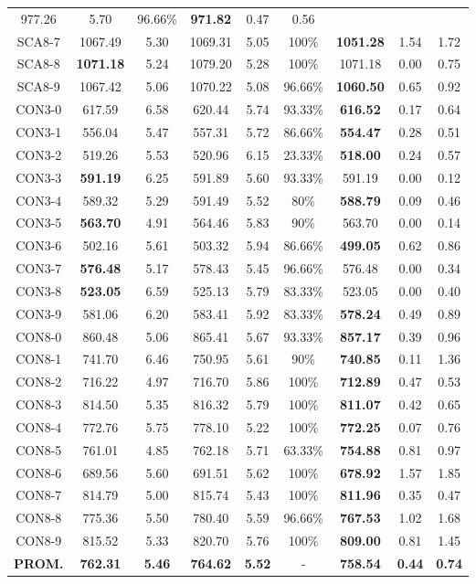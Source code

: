 \begin{table}[ht]
\begin{tabular}{c c c c c c c c c}
977.26 & 5.70 & 96.66\% & \bf{971.82} & 
0.47 & 0.56\\SCA8-7 & 1067.49 & 5.30 & 
1069.31 & 5.05 & 100\% & \bf{1051.28} & 
1.54 & 1.72\\SCA8-8 & \bf{1071.18} & 5.24 & 
1079.20 & 5.28 & 100\% & 1071.18 & 0.00
 & 0.75\\SCA8-9 & 1067.42 & 5.06 & 
1070.22 & 5.08 & 96.66\% & \bf{1060.50} & 
0.65 & 0.92\\CON3-0 & 617.59 & 6.58 & 
620.44 & 5.74 & 93.33\% & \bf{616.52} & 
0.17 & 0.64\\CON3-1 & 556.04 & 5.47 & 
557.31 & 5.72 & 86.66\% & \bf{554.47} & 
0.28 & 0.51\\CON3-2 & 519.26 & 5.53 & 
520.96 & 6.15 & 23.33\% & \bf{518.00} & 
0.24 & 0.57\\CON3-3 & \bf{591.19} & 6.25 & 
591.89 & 5.60 & 93.33\% & 591.19 & 0.00
 & 0.12\\CON3-4 & 589.32 & 5.29 & 
591.49 & 5.52 & 80\% & \bf{588.79} & 
0.09 & 0.46\\CON3-5 & \bf{563.70} & 4.91 & 
564.46 & 5.83 & 90\% & 563.70 & 0.00
 & 0.14\\CON3-6 & 502.16 & 5.61 & 
503.32 & 5.94 & 86.66\% & \bf{499.05} & 
0.62 & 0.86\\CON3-7 & \bf{576.48} & 5.17 & 
578.43 & 5.45 & 96.66\% & 576.48 & 0.00
 & 0.34\\CON3-8 & \bf{523.05} & 6.59 & 
525.13 & 5.79 & 83.33\% & 523.05 & 0.00
 & 0.40\\CON3-9 & 581.06 & 6.20 & 
583.41 & 5.92 & 83.33\% & \bf{578.24} & 
0.49 & 0.89\\CON8-0 & 860.48 & 5.06 & 
865.41 & 5.67 & 93.33\% & \bf{857.17} & 
0.39 & 0.96\\CON8-1 & 741.70 & 6.46 & 
750.95 & 5.61 & 90\% & \bf{740.85} & 
0.11 & 1.36\\CON8-2 & 716.22 & 4.97 & 
716.70 & 5.86 & 100\% & \bf{712.89} & 
0.47 & 0.53\\CON8-3 & 814.50 & 5.35 & 
816.32 & 5.79 & 100\% & \bf{811.07} & 
0.42 & 0.65\\CON8-4 & 772.76 & 5.75 & 
778.10 & 5.22 & 100\% & \bf{772.25} & 
0.07 & 0.76\\CON8-5 & 761.01 & 4.85 & 
762.18 & 5.71 & 63.33\% & \bf{754.88} & 
0.81 & 0.97\\CON8-6 & 689.56 & 5.60 & 
691.51 & 5.62 & 100\% & \bf{678.92} & 
1.57 & 1.85\\CON8-7 & 814.79 & 5.00 & 
815.74 & 5.43 & 100\% & \bf{811.96} & 
0.35 & 0.47\\CON8-8 & 775.36 & 5.50 & 
780.40 & 5.59 & 96.66\% & \bf{767.53} & 
1.02 & 1.68\\CON8-9 & 815.52 & 5.33 & 
820.70 & 5.76 & 100\% & \bf{809.00} & 
0.81 & 1.45\\\bf{PROM.} & 
\bf{762.31} & \bf{5.46} & \bf{764.62} & \bf{5.52} & - & \bf{758.54} & \bf{0.44} & \bf{0.74}\\[1ex]\hline
\end{tabular}
\label{table:GA-M-porcentajeD}
\end{table} \clearpage

